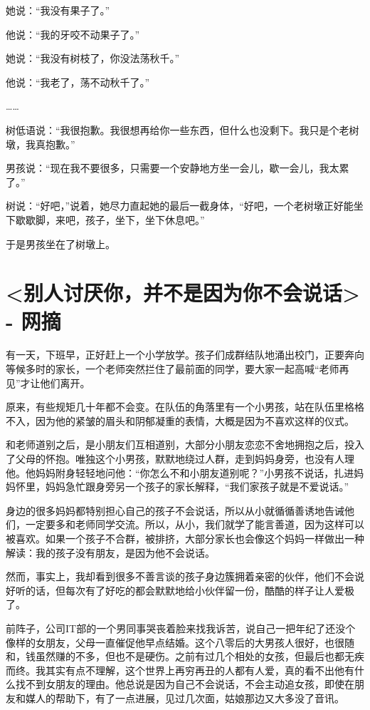 \documentclass[UTF8,a4paper,8pt]{ctexbook}
\begin{document}
	她说：“我没有果子了。” 
	
	他说：“我的牙咬不动果子了。” 
	
	她说：“我没有树枝了，你没法荡秋千。” 
	
	他说：“我老了，荡不动秋千了。” 
	
	…… 
	
	树低语说：“我很抱歉。我很想再给你一些东西，但什么也没剩下。我只是个老树墩，我真抱歉。” 
	
	男孩说：“现在我不要很多，只需要一个安静地方坐一会儿，歇一会儿，我太累了。” 
	
	树说：“好吧，”说着，她尽力直起她的最后一截身体，“好吧，一个老树墩正好能坐下歇歇脚，来吧，孩子，坐下，坐下休息吧。” 
	
	于是男孩坐在了树墩上。
	
\newpage
\section{<别人讨厌你，并不是因为你不会说话> - 网摘}
	有一天，下班早，正好赶上一个小学放学。孩子们成群结队地涌出校门，正要奔向等候多时的家长，一个老师突然拦住了最前面的同学，要大家一起高喊“老师再见”才让他们离开。
	
	原来，有些规矩几十年都不会变。在队伍的角落里有一个小男孩，站在队伍里格格不入，因为他的紧皱的眉头和阴郁凝重的表情，大概是因为不喜欢这样的仪式。
	
	和老师道别之后，是小朋友们互相道别，大部分小朋友恋恋不舍地拥抱之后，投入了父母的怀抱。唯独这个小男孩，默默地绕过人群，走到妈妈身旁，也没有人理他。他妈妈附身轻轻地问他：“你怎么不和小朋友道别呢？”小男孩不说话，扎进妈妈怀里，妈妈急忙跟身旁另一个孩子的家长解释，“我们家孩子就是不爱说话。”
	
	身边的很多妈妈都特别担心自己的孩子不会说话，所以从小就循循善诱地告诫他们，一定要多和老师同学交流。所以，从小，我们就学了能言善道，因为这样可以被喜欢。如果一个孩子不合群，被排挤，大部分家长也会像这个妈妈一样做出一种解读：我的孩子没有朋友，是因为他不会说话。
	
	然而，事实上，我却看到很多不善言谈的孩子身边簇拥着亲密的伙伴，他们不会说好听的话，但每次有了好吃的都会默默地给小伙伴留一份，酷酷的样子让人爱极了。﻿
	
	﻿前阵子，公司IT部的一个男同事哭丧着脸来找我诉苦，说自己一把年纪了还没个像样的女朋友，父母一直催促他早点结婚。这个八零后的大男孩人很好，也很随和，钱虽然赚的不多，但也不是硬伤。之前有过几个相处的女孩，但最后也都无疾而终。我其实有点不理解，这个世界上再穷再丑的人都有人爱，真的看不出他有什么找不到女朋友的理由。他总说是因为自己不会说话，不会主动追女孩，即使在朋友和媒人的帮助下，有了一点进展，见过几次面，姑娘那边又大多没了音讯。
	
\end{document}
